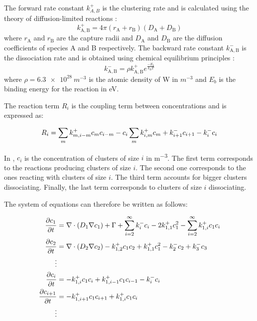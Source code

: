 The forward rate constant $k^+_{A,B}$ is the clustering rate and is calculated using the theory of diffusion-limited reactions :
\begin{equation}
    k^+_\mathrm{A,B} = 4 \pi (r_\mathrm{A} + r_\mathrm{B}) (D_\mathrm{A} + D_\mathrm{B})
\end{equation}
where $r_\mathrm{A}$ and $r_\mathrm{B}$ are the capture radii and $D_\mathrm{A}$ and $D_\mathrm{B}$ are the diffusion coefficients of species A and B respectively.
The backward rate constant $k^-_\mathrm{A,B}$ is the dissociation rate and is obtained using chemical equilibrium principles \cite{goldstein_diffusion_2007}:
\begin{equation}
    k^-_\mathrm{A,B} =\rho k^+_\mathrm{A,B}e^{\frac{-E_b}{k_B T}}
\end{equation}
where $\rho = \SI{6.3e28}{m^{-3}}$ is the atomic density of W in $\si{m^{-3}}$ and $E_b$ is the binding energy for the reaction  in \si{eV}.

The reaction term $R_i$ is the coupling term between concentrations and is expressed as:

\begin{equation}
    R_i=  \sum_{m} k^+_{m,i-m} c_m c_{i-m}  - c_i \sum_m k_{i, m}^+ c_{m} + k_{i+1}^- c_{i+1} -  k_i^- c_i
    \labeq{reaction term}
\end{equation}


In , $c_i$ is the concentration of clusters of size $i$ in \si{m^{-3}}.
The first term corresponds to the reactions producing clusters of size $i$.
The second one corresponds to the ones reacting with clusters of size $i$.
The third term accounts for bigger clusters dissociating.
Finally, the last term corresponds to clusters of size $i$ dissociating.

The system of equations can therefore be written as follows:

\begin{subequations}
    \begin{align}
        \frac{\partial c_1}{\partial t} &= \nabla \cdot (D_1 \nabla c_1) + \Gamma + \sum\limits_{i=2}^\infty k_{i}^- c_i - 2k_{1, 1}^+ c_1^2 - \sum\limits_{i=2}^\infty k_{1,i}^+ c_1 c_i \\
        \frac{\partial c_2}{\partial t} &= \nabla \cdot (D_2 \nabla c_2) - k_{1, 2}^+ c_1 c_2 + k_{1, 1}^+ c_1^2 - k_{2}^- c_2 + k_{3}^- c_3\\
        \vdots \nonumber\\
        \frac{\partial c_i}{\partial t} &= - k_{1, i}^+ c_1 c_i + k_{1, i-1}^+ c_1 c_{i-1} - k_{i}^- c_i\\
        \frac{\partial c_{i+1}}{\partial t} &= - k_{1, i+1}^+ c_1 c_{i+1} + k_{1, i}^+ c_1 c_i\\
        \vdots \nonumber
    \end{align}
    \labeq{temporal evolution no grouping}
\end{subequations}

